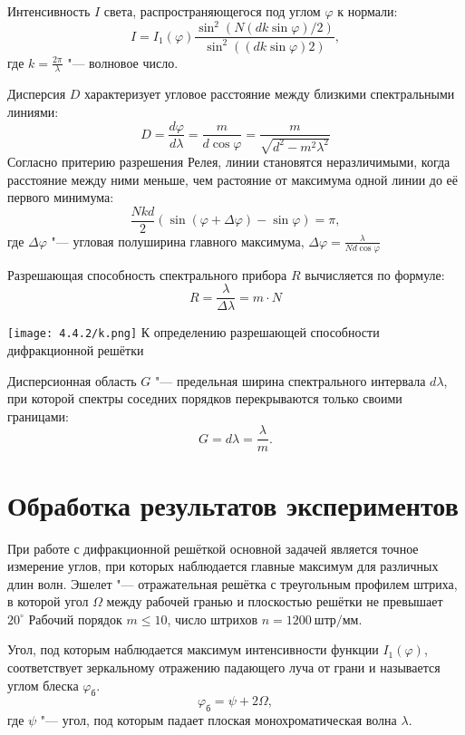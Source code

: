  Интенсивность $I$ света, распространяющегося под углом $\varphi$ к нормали:
 \[
 I = I_1(\varphi)\frac{\sin^2 (N(dk \sin \varphi) / 2)}{\sin^2 ((dk \sin \varphi) 2)},
 \]
 где $k = \frac{2 \pi}{\lambda}$ "--- волновое число.
 
 Дисперсия $D$ характеризует угловое расстояние между близкими спектральными линиями:
 \[
 D = \frac{d \varphi}{d \lambda} = \frac{m}{d \cos \varphi} = \frac{m}{\sqrt{d^2 - m^2 \lambda^2}}
 \]
 Согласно притерию разрешения Релея, линии становятся неразличимыми, когда расстояние между ними меньше, чем растояние от максимума одной линии до её первого минимума:
 \[
    \frac{Nkd}{2}(\sin (\varphi + \Delta \varphi) - \sin \varphi) = \pi,
 \]
 где $\Delta \varphi$ "--- угловая полуширина главного максимума, $\Delta \varphi = \frac{\lambda}{Nd \cos \varphi}$
 
 
 Разрешающая способность спектрального прибора $R$ вычисляется по формуле:
 \[
 R = \frac{\lambda}{\Delta \lambda} = m \cdot N
 \]
\begin{center}
    \texttt{[image: 4.4.2/k.png]}
    {К определению разрешающей способности дифракционной решётки}
\end{center}
Дисперсионная область $G$ "--- предельная ширина спектрального интервала $d \lambda$, при которой спектры соседних порядков перекрываются только своими границами:
\[
G = d \lambda = \frac{\lambda}{m}.
\]

\section*{Обработка результатов экспериментов}
При работе с дифракционной решёткой основной задачей является точное измерение углов, при которых наблюдается главные максимум для различных длин волн.
Эшелет "--- отражательная решётка с  треугольным профилем штриха, в которой угол $\Omega$ между рабочей гранью и плоскостью решётки не превышает $20^\circ$
Рабочий порядок $m \leq 10$, число штрихов $n = 1200\ штр/мм$.

Угол, под которым наблюдается максимум интенсивности функции $I_1 (\varphi)$, соответствует зеркальному отражению падающего луча от грани и называется углом блеска $\varphi_\text{б}$.
\[
    \varphi_\text{б} = \psi + 2 \Omega,
\]
где $\psi$ "--- угол, под которым падает плоская монохроматическая волна $\lambda$.

